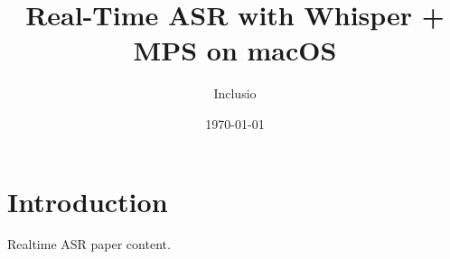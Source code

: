 \documentclass[final,tagged]{pub-paper}
\title{Real-Time ASR with Whisper + MPS on macOS}
\author{Inclusio}
\date{\today}
\begin{document}
\section{Introduction}
Realtime ASR paper content.
\end{document}
